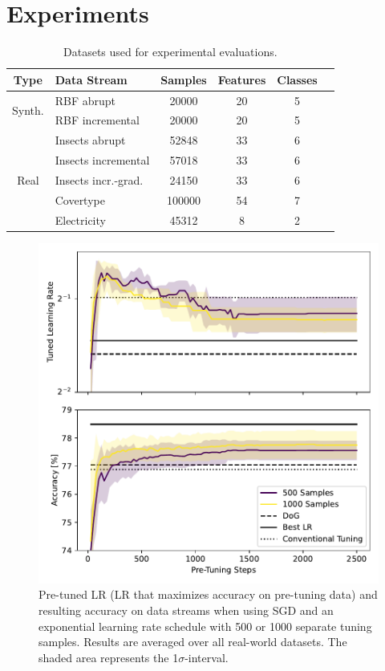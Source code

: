 \documentclass[letterpaper]{article} %
\begin{document}
\section{Experiments}\label{sec:experiments}

\begin{table}[ht]
	\small
	\begin{tabular}{@{}clcccc@{}}
		\toprule
		Type                    & Data Stream            & Samples & Features & Classes \\
		\midrule
		\multirow{2}{*}{Synth.} & RBF abrupt             & 20000   & 20       & 5       \\
		                        & RBF incremental        & 20000   & 20       & 5       \\
		\midrule
		\multirow{5}{*}{Real}   & Insects abrupt         & 52848   & 33       & 6       \\
		                        & Insects incremental    & 57018   & 33       & 6       \\
		                        & Insects incr.-grad.    & 24150   & 33       & 6       \\
		                        & Covertype\footnotemark & 100000  & 54       & 7       \\
		                        & Electricity            & 45312   & 8        & 2       \\
		\bottomrule
	\end{tabular}\label{tab:datasets}
	\caption{Datasets used for experimental evaluations.}
\end{table}



\begin{figure}
	\centering
	\includegraphics[width=.45\textwidth]{figures/pretune_1x64_acc_lr_exp_schedule.pdf}
	\caption{Pre-tuned LR (LR that maximizes accuracy on pre-tuning data) and resulting accuracy on data streams when using SGD and an exponential learning rate schedule with 500 or 1000 separate tuning samples. Results are averaged over all real-world datasets. The shaded area represents the 1$\sigma$-interval.}\label{fig:pretune_lr_accuracy}
\end{figure}
\end{document}
